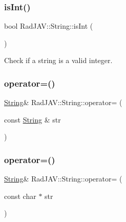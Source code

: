 \subsubsection{\texorpdfstring{is\+Int()}{isInt()}}
{\footnotesize\ttfamily bool Rad\+J\+A\+V\+::\+String\+::is\+Int (\begin{DoxyParamCaption}{ }\end{DoxyParamCaption})}



Check if a string is a valid integer. 

\mbox{\label{class_rad_j_a_v_1_1_string_aeea818d89b0993b64719638e4cc5566d}} 
\subsubsection{\texorpdfstring{operator=()}{operator=()}\hspace{0.1cm}{\footnotesize\ttfamily [1/4]}}
{\footnotesize\ttfamily \mbox{\hyperlink{class_rad_j_a_v_1_1_string}{String}}\& Rad\+J\+A\+V\+::\+String\+::operator= (\begin{DoxyParamCaption}\item[{const \mbox{\hyperlink{class_rad_j_a_v_1_1_string}{String}} \&}]{str }\end{DoxyParamCaption})\hspace{0.3cm}{\ttfamily [inline]}}

\mbox{\label{class_rad_j_a_v_1_1_string_a6fbb39ef74564d3d89725289bb8b0b85}} 
\subsubsection{\texorpdfstring{operator=()}{operator=()}\hspace{0.1cm}{\footnotesize\ttfamily [2/4]}}
{\footnotesize\ttfamily \mbox{\hyperlink{class_rad_j_a_v_1_1_string}{String}}\& Rad\+J\+A\+V\+::\+String\+::operator= (\begin{DoxyParamCaption}\item[{const char $\ast$}]{str }\end{DoxyParamCaption})\hspace{0.3cm}{\ttfamily [inline]}}

